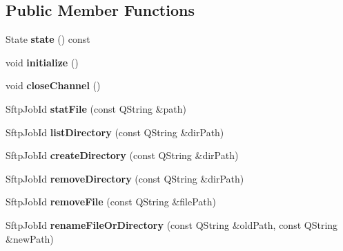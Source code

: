\subsection*{Public Member Functions}
\begin{DoxyCompactItemize}
\item 
\mbox{\label{class_q_ssh_1_1_sftp_channel_a32d1ff95d1975131aeaccbcaa3533995}} 
State {\bfseries state} () const
\item 
\mbox{\label{class_q_ssh_1_1_sftp_channel_a9c751af7796dd9f5244b99b5e3fe7df2}} 
void {\bfseries initialize} ()
\item 
\mbox{\label{class_q_ssh_1_1_sftp_channel_a2eada0358284dc088254fe9537c21362}} 
void {\bfseries close\+Channel} ()
\item 
\mbox{\label{class_q_ssh_1_1_sftp_channel_abb6f9c1276fbc8d04e84264deb48c113}} 
Sftp\+Job\+Id {\bfseries stat\+File} (const Q\+String \&path)
\item 
\mbox{\label{class_q_ssh_1_1_sftp_channel_a22c225764c4f5fa231fa8b3a20507926}} 
Sftp\+Job\+Id {\bfseries list\+Directory} (const Q\+String \&dir\+Path)
\item 
\mbox{\label{class_q_ssh_1_1_sftp_channel_a639042844054b0e986b33c26aa510813}} 
Sftp\+Job\+Id {\bfseries create\+Directory} (const Q\+String \&dir\+Path)
\item 
\mbox{\label{class_q_ssh_1_1_sftp_channel_a413b3eff6814507cdbf6d4959920a4a8}} 
Sftp\+Job\+Id {\bfseries remove\+Directory} (const Q\+String \&dir\+Path)
\item 
\mbox{\label{class_q_ssh_1_1_sftp_channel_a3021178e6163a7e134f4d1c7e729057b}} 
Sftp\+Job\+Id {\bfseries remove\+File} (const Q\+String \&file\+Path)
\item 
\mbox{\label{class_q_ssh_1_1_sftp_channel_a2c8b5ba6de6ca79557295f946f8130c2}} 
Sftp\+Job\+Id {\bfseries rename\+File\+Or\+Directory} (const Q\+String \&old\+Path, const Q\+String \&new\+Path)

\end{DoxyCompactItemize}
